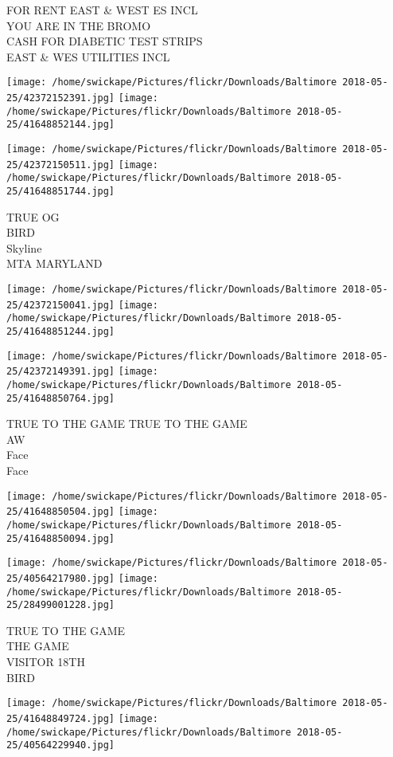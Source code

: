 \documentclass[10pt,letterpaper]{article}
\begin{document}
FOR RENT EAST \& WEST ES INCL\\
YOU ARE IN THE BROMO\\
CASH FOR DIABETIC TEST STRIPS\\
EAST \& WES UTILITIES INCL
\pagebreak

\texttt{[image: /home/swickape/Pictures/flickr/Downloads/Baltimore 2018-05-25/42372152391.jpg]}
\texttt{[image: /home/swickape/Pictures/flickr/Downloads/Baltimore 2018-05-25/41648852144.jpg]}

\texttt{[image: /home/swickape/Pictures/flickr/Downloads/Baltimore 2018-05-25/42372150511.jpg]}
\texttt{[image: /home/swickape/Pictures/flickr/Downloads/Baltimore 2018-05-25/41648851744.jpg]}

TRUE OG\\
BIRD\\
Skyline\\
MTA MARYLAND
\pagebreak

\texttt{[image: /home/swickape/Pictures/flickr/Downloads/Baltimore 2018-05-25/42372150041.jpg]}
\texttt{[image: /home/swickape/Pictures/flickr/Downloads/Baltimore 2018-05-25/41648851244.jpg]}

\texttt{[image: /home/swickape/Pictures/flickr/Downloads/Baltimore 2018-05-25/42372149391.jpg]}
\texttt{[image: /home/swickape/Pictures/flickr/Downloads/Baltimore 2018-05-25/41648850764.jpg]}

TRUE TO THE GAME TRUE TO THE GAME\\
AW\\
Face\\
Face
\pagebreak

\texttt{[image: /home/swickape/Pictures/flickr/Downloads/Baltimore 2018-05-25/41648850504.jpg]}
\texttt{[image: /home/swickape/Pictures/flickr/Downloads/Baltimore 2018-05-25/41648850094.jpg]}

\texttt{[image: /home/swickape/Pictures/flickr/Downloads/Baltimore 2018-05-25/40564217980.jpg]}
\texttt{[image: /home/swickape/Pictures/flickr/Downloads/Baltimore 2018-05-25/28499001228.jpg]}

TRUE TO THE GAME\\
THE GAME\\
VISITOR 18TH\\
BIRD
\pagebreak

\texttt{[image: /home/swickape/Pictures/flickr/Downloads/Baltimore 2018-05-25/41648849724.jpg]}
\texttt{[image: /home/swickape/Pictures/flickr/Downloads/Baltimore 2018-05-25/40564229940.jpg]}
\end{document}
